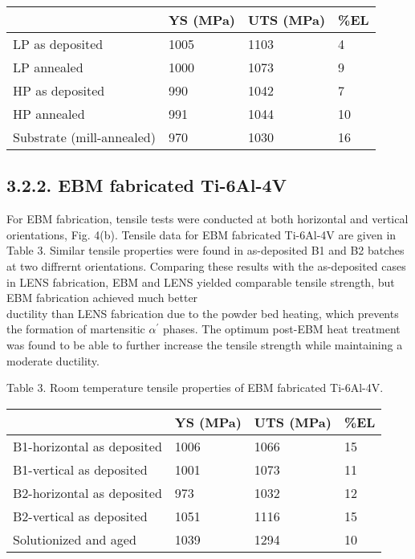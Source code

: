 \documentclass[10pt]{article}
\begin{document}
\begin{center}
\begin{tabular}{llll}
\hline
 & YS (MPa) & UTS (MPa) & \%EL \\
\hline
LP as deposited & 1005 & 1103 & 4 \\
LP annealed & 1000 & 1073 & 9 \\
HP as deposited & 990 & 1042 & 7 \\
HP annealed & 991 & 1044 & 10 \\
Substrate (mill-annealed) & 970 & 1030 & 16 \\
\hline
\end{tabular}
\end{center}

\subsection*{3.2.2. EBM fabricated Ti-6Al-4V}
For EBM fabrication, tensile tests were conducted at both horizontal and vertical orientations, Fig. 4(b). Tensile data for EBM fabricated Ti-6Al-4V are given in Table 3. Similar tensile properties were found in as-deposited B1 and B2 batches at two diffrernt orientations. Comparing these results with the as-deposited cases in LENS fabrication, EBM and LENS yielded comparable tensile strength, but EBM fabrication achieved much better\\
ductility than LENS fabrication due to the powder bed heating, which prevents the formation of martensitic $\alpha^{\prime}$ phases. The optimum post-EBM heat treatment was found to be able to further increase the tensile strength while maintaining a moderate ductility.

Table 3. Room temperature tensile properties of EBM fabricated Ti-6Al-4V.

\begin{center}
\begin{tabular}{llll}
\hline
 & YS (MPa) & UTS (MPa) & \%EL \\
\hline
B1-horizontal as deposited & 1006 & 1066 & 15 \\
B1-vertical as deposited & 1001 & 1073 & 11 \\
B2-horizontal as deposited & 973 & 1032 & 12 \\
B2-vertical as deposited & 1051 & 1116 & 15 \\
Solutionized and aged & 1039 & 1294 & 10 \\
\hline
\end{tabular}
\end{center}
\end{document}
